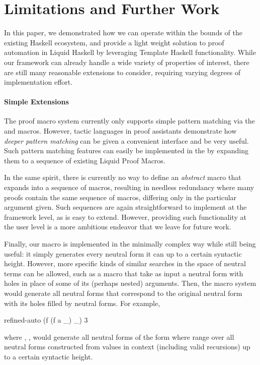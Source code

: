 \section{Limitations and Further Work}
\label{sec:future}

In this paper, we demonstrated how we can operate within the bounds of
the existing Haskell ecosystem, and provide a light weight solution to
proof automation in Liquid Haskell by leveraging Template Haskell
functionality. While our framework can already handle a wide variety
of properties of interest, there are still many reasonable extensions
to consider, requiring varying degrees of implementation effort.


\paragraph{Simple Extensions}

The proof macro system currently only supports simple pattern matching
via the  and  macros. However, tactic
languages in proof assistants demonstrate how {\em deeper pattern
  matching} can be given a convenient interface and be very
useful. Such pattern matching features can easily be implemented in
the \LangA by expanding them to a sequence of existing Liquid Proof Macros.

In the same spirit, there is currently no way to define an
\textit{abstract} macro that expands into a sequence of macros,
resulting in needless redundancy where many proofs contain the same
sequence of macros, differing only in the particular argument given.
Such sequences are again straightforward to implement at the framework
level, as \LangA is easy to extend. However, providing such
functionality at the user level is a more ambitious endeavor that we
leave for future work.

Finally, our  macro is implemented in the minimally complex way
while still being useful: it simply generates every neutral form it can up
to a certain syntactic height.  However, more specific kinds of
similar searches in the space of neutral terms can be allowed, such as
a  macro that take as input a neutral form with holes
in place of some of its (perhaps nested) arguments. Then, the macro
system would generate all neutral forms that correspond to the
original neutral form with its holes filled by neutral forms. For
example,
\begin{code}
  refined-auto (f (f a _) _) 3
\end{code}
where , ,
would generate all neutral forms of the form  where 
 range over all neutral forms constructed from values in context
(including valid recursions) up to a certain syntactic height.

